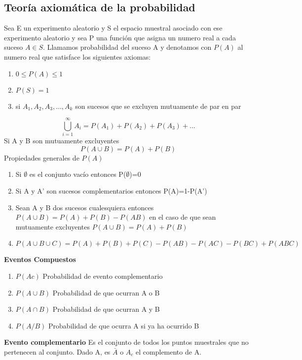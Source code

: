 \documentclass[10pt,a4paper]{article}
\begin{document}
\subsection{Teoría axiomática de la probabilidad}
Sea E un experimento aleatorio y S el espacio muestral asociado con ese experimento aleatorio y sea P una función que asigna un numero real a cada suceso $A\in S$. Llamamos probabilidad del suceso A y denotamos con $P(A)$ al numero real que satisface los siguientes axiomas:
\begin{enumerate}
	\item $0\leq P(A)\leq 1$
	\item $P(S)=1$
	\item si $A_1,A_2,A_3,\dots,A_k$ son sucesos que se excluyen mutuamente de par en par
\end{enumerate}
\begin{equation}
	\bigcup\limits_{i=1}^{\infty} A_{i} = P(A_1)+P(A_2)+P(A_3)+\dots
\end{equation}
Si A y B son mutuamente excluyentes
\begin{equation}
	P(A\cup B)=P(A)+P(B)
\end{equation}
Propiedades generales de $P(A)$
\begin{enumerate}
	\item Si $\emptyset$ es el conjunto vacío entonces P($\emptyset$)=0
	\item Si A y A' son sucesos complementarios entonces P(A)=1-P(A')
	\item Sean A y B dos sucesos cualesquiera entonces $P(A\cup B)=P(A)+P(B)-P(AB)$ en el caso de que sean mutuamente excluyentes $P(A\cup B)=P(A)+P(B)$
	\item $P(A\cup B\cup C)=P(A)+P(B)+P(C)-P(AB)-P(AC)-P(BC)+P(ABC)$
\end{enumerate}

\textbf{Eventos Compuestos}
\begin{enumerate}
	\item $P(Ac)$ Probabilidad de evento complementario
	\item $P(A\cup B)$ Probabilidad de que ocurran A o B
	\item $P(A\cap B)$ Probabilidad de que ocurran A y B
	\item $P(A/B)$ Probabilidad de que ocurra A si ya ha ocurrido B
\end{enumerate}



\textbf{Evento complementario}
Es el conjunto de todos los puntos muestrales que no pertenecen al conjunto. Dado A, es $\bar{A}$ o $A_c$ el complemento de A.\\
\end{document}

